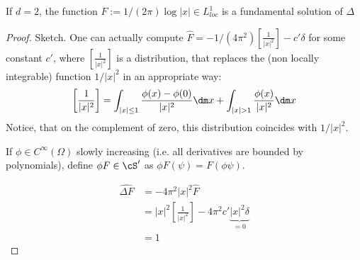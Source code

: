 \begin{proposition}
	If $d = 2$, the function $F := 1/(2\pi) \log |x| \in L^1_{loc}$ is a fundamental solution of $\Delta$
\end{proposition}
\begin{proof} Sketch.
	One can actually compute $\hat F = -1 / (4\pi^2) \left [\frac{1}{|x|^2} \right] - c' \delta$ for some constant $c'$, where  $\left [\frac{1}{|x|^2} \right]$ is a distribution, that replaces the (non locally integrable) function $1  / |x|^2$ in an appropriate way:
	\[
	\left [\frac{1}{|x|^2} \right] = \int_{|x| \le 1} \frac{\phi(x) - \phi(0)}{|x|^2} \dm x + \int_{|x| > 1} \frac{\phi(x)}{|x|^2} \dm x
	\]
	Notice, that on the complement of zero, this distribution coincides with $1 / |x|^2$.
	\begin{notation}
		If $\phi \in C^\infty(\Omega)$ slowly increasing (i.e. all derivatives are bounded by polynomials), define $\phi F \in \cS'$ as $\phi F(\psi) = F(\phi \psi)$.
	\end{notation}
	\begin{align*}
		\widehat{ \Delta F} &= -4 \pi^2 |x|^2 \hat F\\
		&=  |x|^2 \left [\frac{1}{|x|^2} \right] - 4\pi^2 c' \underbrace{|x|^2 \delta}_{=0} \\
		&= 1
	\end{align*}
\end{proof}
